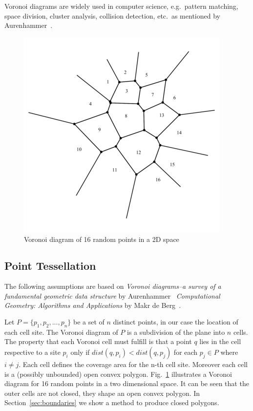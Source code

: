 \documentclass[master,english]{hgbthesis}
\begin{document}
Voronoi diagrams are widely used in computer science, e.g.\ pattern matching, space division, cluster analysis, collision detection, etc.\ as mentioned by Aurenhammer~\cite{Aurenhammer1991}. 

\begin{figure}

	\centering

	\includegraphics[width=0.7\linewidth]{./images/voronoi2.png}

	\caption{Voronoi diagram of 16 random points in a 2D space}

	\label{fig:voronoi2}

\end{figure}

\subsection{Point Tessellation}

The following assumptions are based on \emph{Voronoi diagrams--a survey of a fundamental geometric data structure} by Aurenhammer~\cite{Aurenhammer1991} \emph{Computational Geometry: Algorithms and Applications} by Makr de Berg~\cite{Berg2000}.

Let $P=\{p_1,p_2,...,p_n\}$ be a set of $n$ distinct points, in our case the location of each cell site. The Voronoi diagram of $P$ is a subdivision of the plane into $n$ cells. The property that each Voronoi cell must fulfill is that a point $q$ lies in the cell respective to a site $p_i$ only if $dist\left(q,p_i\right) < dist\left(q,p_j\right)$ for each $p_j \in P$ where $i \neq j$. Each cell defines the coverage area for the n-th cell site. Moreover each cell is a (possibly unbounded) open convex polygon. Fig.\ \ref{fig:voronoi2} illustrates a Voronoi diagram for 16 random points in a two dimensional space. It can be seen that the outer cells are not closed, they shape an open convex polygon. In Section~\ref{sec:boundaries} we show a method to produce closed polygons.
\end{document}
